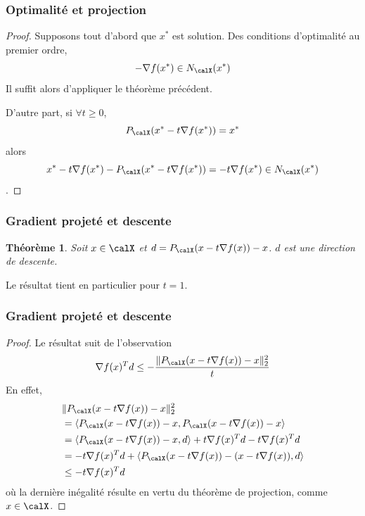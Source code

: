 \documentclass[t,aspectratio=169,usepdftitle=false]{beamer}
\newtheorem{thm}{Théorème}
\def\cX{\calX}
\begin{document}
\begin{frame}
\frametitle{Optimalité et projection}

\begin{proof}
Supposons tout d'abord que $x^*$ est solution.
Des conditions d'optimalité au premier ordre, 
$$-\nabla f(x^*) \in N_{\cX}(x^*)$$
Il suffit alors d'appliquer le théorème précédent.

\mbox{}

D'autre part, si $\forall t \geq 0$,
$$
P_{\cX}(x^* - t\nabla f(x^*)) = x^*
$$
alors
$$
x^* - t\nabla f(x^*) - P_{\cX}(x^* - t\nabla f(x^*)) = -t\nabla f(x^*) \in N_{\cX}(x^*)$$.
\end{proof}

\end{frame}

\begin{frame}
\frametitle{Gradient projeté et descente}

\begin{thm}
Soit $x \in \cX$ et $d = P_{\cX}(x - t\nabla f(x)) - x$.
$d$ est une direction de descente.
\end{thm}

Le résultat tient en particulier pour $t = 1$.

\end{frame}

\begin{frame}
\frametitle{Gradient projeté et descente}

\begin{proof}
Le résultat suit de l'observation
$$
\nabla f(x)^T d
\leq -\frac{\| P_{\cX}(x - t\nabla f(x)) - x \|^2_2}{t} 
$$
En effet,
\begin{align*}
& \| P_{\cX}(x - t\nabla f(x)) - x \|^2_2 \\
& = \langle P_{\cX}(x - t\nabla f(x)) - x, P_{\cX}(x - t\nabla f(x)) - x \rangle \\
& = \langle P_{\cX}(x - t\nabla f(x)) - x, d \rangle + t\nabla f(x)^Td - t\nabla f(x)^Td \\
& = - t\nabla f(x)^Td + \langle P_{\cX}(x - t\nabla f(x)) - (x - t\nabla f(x)), d \rangle \\
& \leq - t\nabla f(x)^Td
\end{align*}
où la dernière inégalité résulte en vertu du théorème de projection, comme $x \in \cX$.
\end{proof}

\end{frame}
\end{document}
